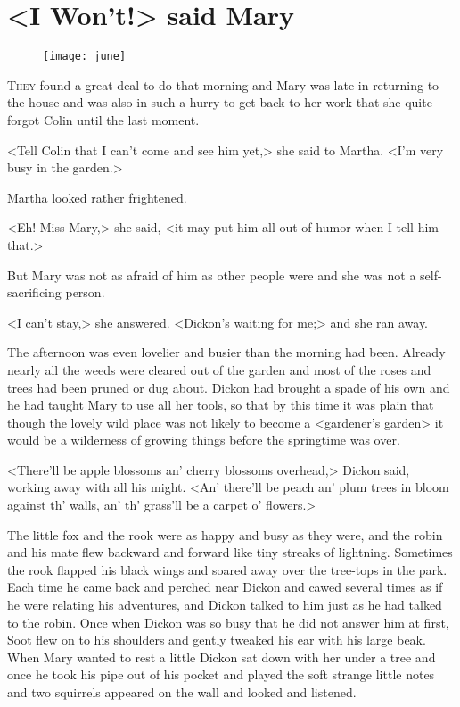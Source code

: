\chapter{<I Won't!> said Mary} 
	
\begin{figure}[t!]
\centering
\texttt{[image: june]}
\end{figure}

	\lettrine[]{T}{hey} found a great deal to do that morning and Mary was late in returning to the house and was also in such a hurry to get back to her work that she quite forgot Colin until the last moment.

\zz
<Tell Colin that I can't come and see him yet,> she said to Martha. <I'm very busy in the garden.>

Martha looked rather frightened.

<Eh! Miss Mary,> she said, <it may put him all out of humor when I tell him that.>

But Mary was not as afraid of him as other people were and she was not a self-sacrificing person.

<I can't stay,> she answered. <Dickon's waiting for me;> and she ran away.

The afternoon was even lovelier and busier than the morning had been. Already nearly all the weeds were cleared out of the garden and most of the roses and trees had been pruned or dug about. Dickon had brought a spade of his own and he had taught Mary to use all her tools, so that by this time it was plain that though the lovely wild place was not likely to become a <gardener's garden> it would be a wilderness of growing things before the springtime was over.

<There'll be apple blossoms an' cherry blossoms overhead,> Dickon said, working away with all his might. <An' there'll be peach an' plum trees in bloom against th' walls, an' th' grass'll be a carpet o' flowers.>

The little fox and the rook were as happy and busy as they were, and the robin and his mate flew backward and forward like tiny streaks of lightning. Sometimes the rook flapped his black wings and soared away over the tree-tops in the park. Each time he came back and perched near Dickon and cawed several times as if he were relating his adventures, and Dickon talked to him just as he had talked to the robin. Once when Dickon was so busy that he did not answer him at first, Soot flew on to his shoulders and gently tweaked his ear with his large beak. When Mary wanted to rest a little Dickon sat down with her under a tree and once he took his pipe out of his pocket and played the soft strange little notes and two squirrels appeared on the wall and looked and listened.

